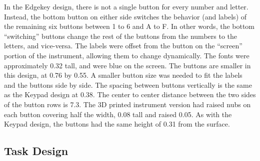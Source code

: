In the Edgekey design, there is not a single button for every number and letter.
Instead, the bottom button on either side switches the behavior (and labels) of the remaining six buttons between 1 to 6 and A to F.
In other words, the bottom ``switching'' buttons change the rest of the buttons from the numbers to the letters, and vice-versa.
The labels were offset from the button on the ``screen'' portion of the instrument, allowing them to change dynamically.
The fonts were approximately \SI{0.32}{\inch} tall, and were blue on the screen.
The buttons are smaller in this design, at \SI{0.76}{\inch} by \SI{0.55}{\inch}.
A smaller button size was needed to fit the labels and the buttons side by side.
The spacing between buttons vertically is the same as the Keypad design at \SI{0.38}{\inch}.
The center to center distance between the two sides of the button rows is \SI{7.3}{\inch}.
The 3D printed instrument version had raised nubs on each button covering half the width, \SI{0.08}{\inch} tall and raised \SI{0.05}{\inch}.
As with the Keypad design, the buttons had the same height of \SI{0.31}{\inch} from the surface.

\subsection{Task Design}



%

